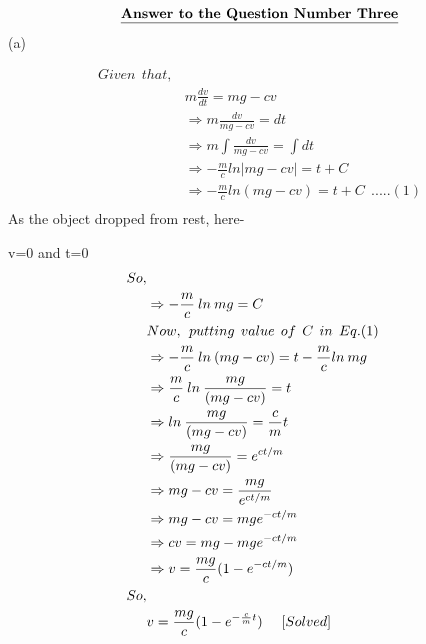 \documentclass{article}
\begin{document}

                
\begin{homeworkProblem}
    \[      \textbf{\underline{Answer to the Question Number Three}}
    \]
    (a)

\begin{align*}
    Given\:\:that,\\
    & m \frac{dv}{dt}=mg-cv\\
    &\Rightarrow m \frac{dv}{mg-cv}=dt\\
    &\Rightarrow m \int \frac{dv}{mg-cv}=\int dt\\
    &\Rightarrow -\frac{m}{c}ln|mg-cv|=t+C \\
    &\Rightarrow -\frac{m}{c}ln(mg-cv)=t+C\:\:.....(1)\\
\end{align*}
As the object dropped from rest, here-
\par
\vspace{5mm}
\hspace{60mm}
v=0 and t=0
\begin{align*}
    So,\\
    &\Rightarrow -\frac{m}{c}\:ln\:mg=C \\
    \vspace{5mm}
    &Now,\:\:putting\:\:value\:\:of\:\:C\:\:in\:\:Eq.(1)\\
    \vspace{5mm}
    &\Rightarrow -\frac{m}{c}\:ln\:(mg-cv)=t-\frac{m}{c}ln\:mg\\
    &\Rightarrow \frac{m}{c}\:ln\:\frac{mg}{(mg-cv)}=t\\
    &\Rightarrow ln\:\frac{mg}{(mg-cv)}=\frac{c}{m}t\\
    &\Rightarrow \frac{mg}{(mg-cv)}=e^{ct/m}\\
    &\Rightarrow mg-cv=\frac{mg}{e^{ct/m}}\\
    &\Rightarrow mg-cv=mge^{-ct/m}\\
    &\Rightarrow cv=mg-mge^{-ct/m}\\
    &\Rightarrow v=\frac{mg}{c}(1-e^{-ct/m})\\
    So,\\
    &v=\frac{mg}{c}(1-e^{-\frac{c}{m}t})\:\:\:\:\:\:[Solved]\\
\end{align*}


\end{homeworkProblem}
\end{document}

